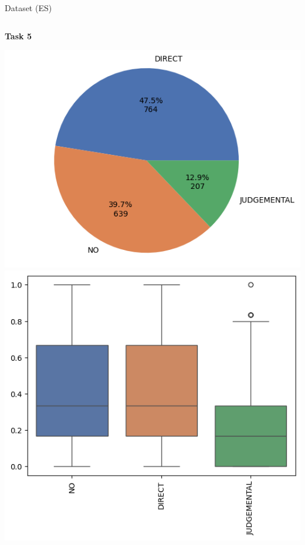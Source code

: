 \begin{frame}{Dataset (ES)}
\begin{columns}[T]
        \begin{column}{0.3\textwidth}
            \centering %
            \textbf{Task 5}

            \includegraphics[height=0.4\textheight, width=\textwidth, keepaspectratio]{images/t5_es_hard_presentacion.png}%
            \vfill
            \includegraphics[height=0.4\textheight, width=\textwidth, keepaspectratio]{images/t5_es_soft_presentacion.png}%
        \end{column}


\end{columns}
\end{frame}

